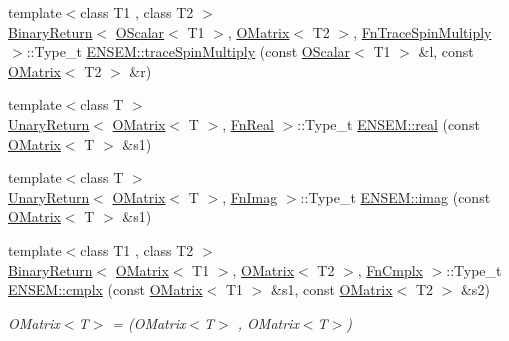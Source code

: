\begin{DoxyCompactItemize}
\item 
{\footnotesize template$<$class T1 , class T2 $>$ }\\\mbox{\hyperlink{structENSEM_1_1BinaryReturn}{Binary\+Return}}$<$ \mbox{\hyperlink{classENSEM_1_1OScalar}{O\+Scalar}}$<$ T1 $>$, \mbox{\hyperlink{classENSEM_1_1OMatrix}{O\+Matrix}}$<$ T2 $>$, \mbox{\hyperlink{structENSEM_1_1FnTraceSpinMultiply}{Fn\+Trace\+Spin\+Multiply}} $>$\+::Type\+\_\+t \mbox{\hyperlink{group__obsmatrix_gaa152d77bf9e2e211ff35c733b40f6c64}{E\+N\+S\+E\+M\+::trace\+Spin\+Multiply}} (const \mbox{\hyperlink{classENSEM_1_1OScalar}{O\+Scalar}}$<$ T1 $>$ \&l, const \mbox{\hyperlink{classENSEM_1_1OMatrix}{O\+Matrix}}$<$ T2 $>$ \&r)
\item 
{\footnotesize template$<$class T $>$ }\\\mbox{\hyperlink{structENSEM_1_1UnaryReturn}{Unary\+Return}}$<$ \mbox{\hyperlink{classENSEM_1_1OMatrix}{O\+Matrix}}$<$ T $>$, \mbox{\hyperlink{structENSEM_1_1FnReal}{Fn\+Real}} $>$\+::Type\+\_\+t \mbox{\hyperlink{group__obsmatrix_gaa89ce5a88c3ccb5020ce1319e041cacd}{E\+N\+S\+E\+M\+::real}} (const \mbox{\hyperlink{classENSEM_1_1OMatrix}{O\+Matrix}}$<$ T $>$ \&s1)
\item 
{\footnotesize template$<$class T $>$ }\\\mbox{\hyperlink{structENSEM_1_1UnaryReturn}{Unary\+Return}}$<$ \mbox{\hyperlink{classENSEM_1_1OMatrix}{O\+Matrix}}$<$ T $>$, \mbox{\hyperlink{structENSEM_1_1FnImag}{Fn\+Imag}} $>$\+::Type\+\_\+t \mbox{\hyperlink{group__obsmatrix_ga227c6429f15ec19a09a182551be38dad}{E\+N\+S\+E\+M\+::imag}} (const \mbox{\hyperlink{classENSEM_1_1OMatrix}{O\+Matrix}}$<$ T $>$ \&s1)
\item 
{\footnotesize template$<$class T1 , class T2 $>$ }\\\mbox{\hyperlink{structENSEM_1_1BinaryReturn}{Binary\+Return}}$<$ \mbox{\hyperlink{classENSEM_1_1OMatrix}{O\+Matrix}}$<$ T1 $>$, \mbox{\hyperlink{classENSEM_1_1OMatrix}{O\+Matrix}}$<$ T2 $>$, \mbox{\hyperlink{structENSEM_1_1FnCmplx}{Fn\+Cmplx}} $>$\+::Type\+\_\+t \mbox{\hyperlink{group__obsmatrix_ga28de8e5b7b3d990424b77f7d9eeb2ec1}{E\+N\+S\+E\+M\+::cmplx}} (const \mbox{\hyperlink{classENSEM_1_1OMatrix}{O\+Matrix}}$<$ T1 $>$ \&s1, const \mbox{\hyperlink{classENSEM_1_1OMatrix}{O\+Matrix}}$<$ T2 $>$ \&s2)
\begin{DoxyCompactList}\small\item\em O\+Matrix$<$\+T$>$ = (O\+Matrix$<$\+T$>$ , O\+Matrix$<$\+T$>$) \end{DoxyCompactList}\item 

\end{DoxyCompactItemize}
